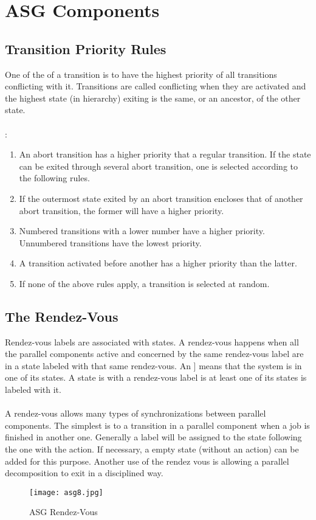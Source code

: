 \documentclass[../main.tex]{subfiles}
\begin{document}
\section{ASG Components}

\subsection{Transition Priority Rules}
One of the  of a transition is to have the highest priority of all transitions conflicting  with it. Transitions are called conflicting when they are activated and the highest state (in hierarchy) exiting is the same, or an ancestor, of the other state.
\\\\
:
\begin{enumerate}
	\item An abort transition has a higher priority that a regular transition. If the state can be exited through several abort transition, one is selected according to the following rules.
	\item If the outermost state exited by an abort transition encloses that of another abort transition, the former will have a higher priority.
	\item Numbered transitions with a lower number have a higher priority. Unnumbered transitions have the lowest priority.
	\item A transition activated before another has a higher priority than the latter.
	\item If none of the above rules apply, a transition is selected at random.
\end{enumerate}

\subsection{The Rendez-Vous}
Rendez-vous labels are associated with states.
A rendez-vous happens when all the parallel components active and concerned by the same rendez-vous label are in a state labeled with that same rendez-vous.
An ] means that the system is in one of its states.
A state is  with a rendez-vous label is at least one of its states is labeled with it.
\\\\
A rendez-vous allows many types of synchronizations between parallel components.
The simplest is to  a transition in a parallel component when a job is finished in another one.
Generally a label will be assigned to the state following the one with the action.
If necessary, a empty state (without an action) can be added for this purpose.
Another use of the rendez vous is allowing a parallel decomposition to exit in a disciplined way.
\begin{figure}[H]
    \centering
    \texttt{[image: asg8.jpg]}
    \caption{ASG Rendez-Vous}
    \label{asg8}
\end{figure}
\end{document}
